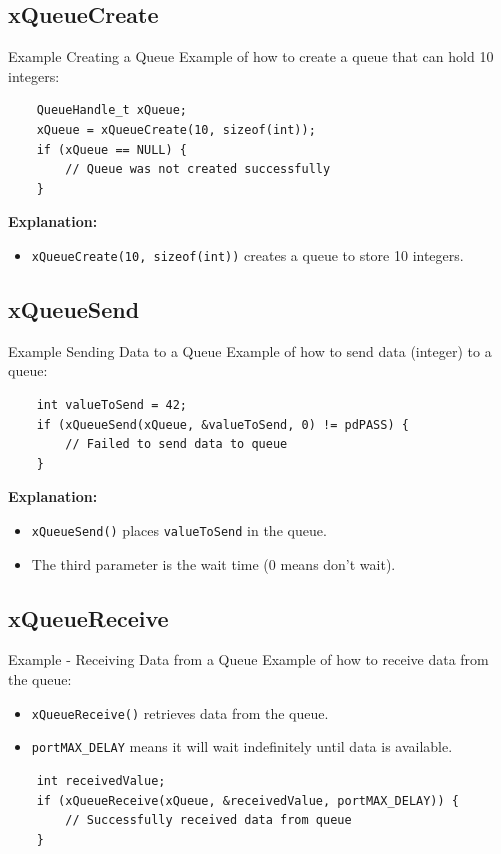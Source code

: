\documentclass[10pt]{beamer}
\begin{document}
\subsection{xQueueCreate}
\begin{frame}[fragile]{Example Creating a Queue}
    Example of how to create a queue that can hold 10 integers:
    \begin{verbatim}
    QueueHandle_t xQueue;
    xQueue = xQueueCreate(10, sizeof(int));
    if (xQueue == NULL) {
        // Queue was not created successfully
    }
    \end{verbatim}
    \textbf{Explanation:}
    \begin{itemize}
        \item \texttt{xQueueCreate(10, sizeof(int))} creates a queue to store 10 integers.
    \end{itemize}
\end{frame}

\subsection{xQueueSend}
\begin{frame}[fragile]{Example Sending Data to a Queue}
    Example of how to send data (integer) to a queue:
    \begin{lstlisting}
    int valueToSend = 42;
    if (xQueueSend(xQueue, &valueToSend, 0) != pdPASS) {
        // Failed to send data to queue
    }
    \end{lstlisting}
    \textbf{Explanation:}
    \begin{itemize}
        \item \texttt{xQueueSend()} places \texttt{valueToSend} in the queue.
        \item The third parameter is the wait time (0 means don't wait).
    \end{itemize}
\end{frame}

\subsection{xQueueReceive}
\begin{frame}[fragile]{Example - Receiving Data from a Queue}
    Example of how to receive data from the queue:

    \begin{itemize}
        \item \texttt{xQueueReceive()} retrieves data from the queue.
        \item \texttt{portMAX\_DELAY} means it will wait indefinitely until data is available.
    \end{itemize}

    \begin{lstlisting}
    int receivedValue;
    if (xQueueReceive(xQueue, &receivedValue, portMAX_DELAY)) {
        // Successfully received data from queue
    }
    \end{lstlisting}

\end{frame}
\end{document}
